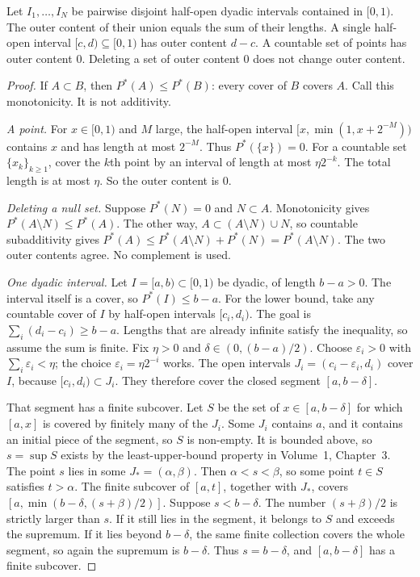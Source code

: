 \begin{lemmax}
Let $I_1,\ldots,I_N$ be pairwise disjoint half-open dyadic intervals contained in $[0,1)$. The outer content of their union equals the sum of their lengths. A single half-open interval $[c,d)\subseteq[0,1)$ has outer content $d-c$. A countable set of points has outer content $0$. Deleting a set of outer content $0$ does not change outer content.
\end{lemmax}
\begin{proof}
If $A\subset B$, then $P^*(A)\le P^*(B)$: every cover of $B$ covers $A$. Call this monotonicity. It is not additivity.

\emph{A point.} For $x\in[0,1)$ and $M$ large, the half-open interval $[x,\min(1,x+2^{-M}))$ contains $x$ and has length at most $2^{-M}$. Thus $P^*(\{x\})=0$. For a countable set $\{x_k\}_{k\ge1}$, cover the $k$th point by an interval of length at most $\eta 2^{-k}$. The total length is at most $\eta$. So the outer content is $0$.

\emph{Deleting a null set.} Suppose $P^*(N)=0$ and $N\subset A$. Monotonicity gives $P^*(A\setminus N)\le P^*(A)$. The other way, $A\subset(A\setminus N)\cup N$, so countable subadditivity gives $P^*(A)\le P^*(A\setminus N)+P^*(N)=P^*(A\setminus N)$. The two outer contents agree. No complement is used.

\emph{One dyadic interval.} Let $I=[a,b)\subset[0,1)$ be dyadic, of length $b-a>0$. The interval itself is a cover, so $P^*(I)\le b-a$. For the lower bound, take any countable cover of $I$ by half-open intervals $[c_i,d_i)$. The goal is $\sum_i(d_i-c_i)\ge b-a$. Lengths that are already infinite satisfy the inequality, so assume the sum is finite. Fix $\eta>0$ and $\delta\in(0,(b-a)/2)$. Choose $\varepsilon_i>0$ with $\sum_i\varepsilon_i<\eta$; the choice $\varepsilon_i=\eta 2^{-i}$ works. The open intervals $J_i=(c_i-\varepsilon_i,d_i)$ cover $I$, because $[c_i,d_i)\subset J_i$. They therefore cover the closed segment $[a,b-\delta]$.

That segment has a finite subcover. Let $S$ be the set of $x\in[a,b-\delta]$ for which $[a,x]$ is covered by finitely many of the $J_i$. Some $J_i$ contains $a$, and it contains an initial piece of the segment, so $S$ is non-empty. It is bounded above, so $s=\sup S$ exists by the least-upper-bound property in Volume~1, Chapter~3. The point $s$ lies in some $J_*=(\alpha,\beta)$. Then $\alpha<s<\beta$, so some point $t\in S$ satisfies $t>\alpha$. The finite subcover of $[a,t]$, together with $J_*$, covers $[a,\min(b-\delta,(s+\beta)/2)]$. Suppose $s<b-\delta$. The number $(s+\beta)/2$ is strictly larger than $s$. If it still lies in the segment, it belongs to $S$ and exceeds the supremum. If it lies beyond $b-\delta$, the same finite collection covers the whole segment, so again the supremum is $b-\delta$. Thus $s=b-\delta$, and $[a,b-\delta]$ has a finite subcover.


\end{proof}
